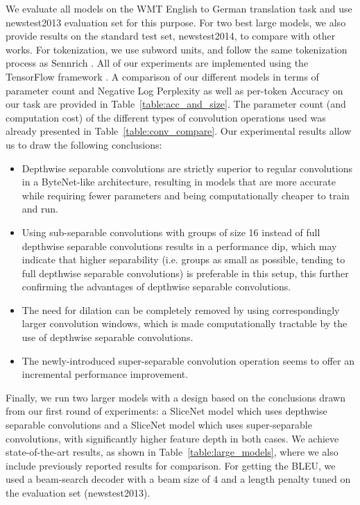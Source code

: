 \documentclass{article}
\begin{document}
We evaluate all models on the WMT English to German translation task and use newstest2013 evaluation set for this purpose.
For two best large models, we also provide results on the standard test set, newstest2014, to compare with other works.
For tokenization, we use subword units, and follow the same tokenization process as Sennrich \cite{SennrichHB15}.
All of our experiments are implemented using the TensorFlow framework \cite{tensorflow}.
%
A comparison of our different models in terms of parameter count and Negative Log Perplexity
as well as per-token Accuracy on our task are provided in Table~\ref{table:acc_and_size}.
The parameter count (and computation cost) of the different types of convolution operations used
was already presented in Table~\ref{table:conv_compare}.
%
Our experimental results allow us to draw the following conclusions:

\begin{itemize}
    \item Depthwise separable convolutions are strictly superior to regular convolutions in a ByteNet-like architecture, resulting in models that are more accurate while requiring fewer parameters and being computationally cheaper to train and run.
    \item Using sub-separable convolutions with groups of size 16 instead of full depthwise separable convolutions results in a performance dip, which may indicate that higher separability (i.e. groups as small as possible, tending to full depthwise separable convolutions) is preferable in this setup, this further confirming the advantages of depthwise separable convolutions.
    \item The need for dilation can be completely removed by using correspondingly larger convolution windows, which is made computationally tractable by the use of depthwise separable convolutions.
    \item The newly-introduced super-separable convolution operation seems to offer an incremental performance improvement.
\end{itemize}

Finally, we run two larger models with a design based on the conclusions drawn from our first round of experiments: a SliceNet model which uses depthwise separable convolutions and a SliceNet model which uses super-separable convolutions, with significantly higher feature depth in both cases. We achieve state-of-the-art results, as shown in Table~\ref{table:large_models}, where we also include
previously reported results for comparison. For getting the BLEU, we used a beam-search decoder with a beam size of $4$ and
a length penalty tuned on the evaluation set (newstest2013).
\end{document}
